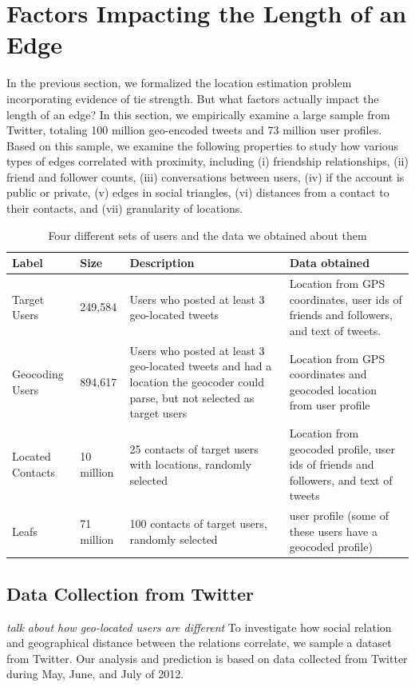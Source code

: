 \documentclass[letterpaper]{article}
\newcommand{\jam}[1]{\emph{#1}}
\begin{document}
\section{Factors Impacting the Length of an Edge}
In the previous section, we formalized the location estimation problem incorporating evidence of tie strength. But what factors actually impact the length of an edge? In this section, we empirically examine a large sample from Twitter, totaling 100 million geo-encoded tweets and 73 million user profiles.
%
Based on this sample, we examine the following properties to study how various
types of edges correlated with proximity, including
    (i) friendship relationships,
    (ii) friend and follower counts,
    (iii) conversations between users,
    (iv) if the account is public or private,
    (v) edges in social triangles,
    (vi) distances from a contact to their contacts, and
    (vii) granularity of locations.

\begin{table}[tbh]
\scriptsize
\centering
\begin{tabular}{l l p{4cm} p{6cm}}
    Label & Size & Description & Data obtained \\
    \hline
    Target Users & 249,584 & Users who posted at least 3 geo-located tweets &
    Location from GPS coordinates, user ids of friends and followers,
    and text of tweets. \\
    Geocoding Users & 894,617 & Users who posted at least 3 geo-located tweets
    and had a location the geocoder could parse, but not selected as target users &
    Location from GPS coordinates and geocoded location from user profile \\
    Located Contacts & 10 million & 25 contacts of target users with locations, randomly selected &
    Location from geocoded profile, user ids of friends and followers, and text of tweets \\
    Leafs & 71 million & 100 contacts of target users, randomly selected &
    user profile (some of these users have a geocoded profile)\\
\end{tabular}
\caption{Four different sets of users and the data we obtained about them}
\label{tab:datasets}
\end{table}

\subsection{Data Collection from Twitter}
\jam{talk about how geo-located users are different}
To investigate how social relation and geographical distance between the
relations correlate, we sample a dataset from Twitter.
%
Our analysis and prediction is based on data collected from Twitter during
May, June, and July of 2012.
\end{document}
